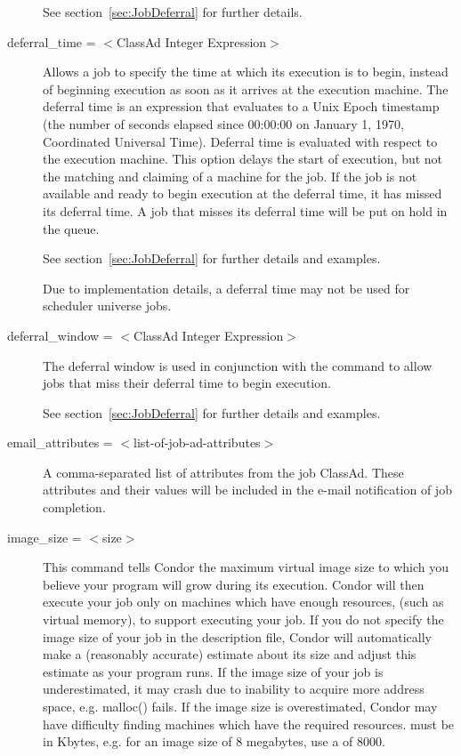 \begin{description}
See section~\ref{sec:JobDeferral} for further details.


\item[deferral\_time = $<$ClassAd Integer Expression$>$]
Allows a job to specify the time at which its execution
is to begin,
instead of beginning execution as soon as it arrives at the execution
machine. The deferral time is an expression that 
evaluates to a Unix Epoch timestamp (the number of
seconds elapsed since 00:00:00 on January 1, 1970, Coordinated
Universal Time). 
Deferral time is evaluated with respect to the execution machine.
This option delays the start of
execution, but not the matching and claiming of
a machine for the job.
If the job is not available and ready to begin
execution at the deferral time, it has missed its deferral time.
A job that misses its deferral time will be put on hold
in the queue. 

See section~\ref{sec:JobDeferral} for further details and examples.

Due to implementation details,
a deferral time may not be used for scheduler universe jobs.


\item[deferral\_window = $<$ClassAd Integer Expression$>$]
The deferral window is used in conjunction with the
 command to allow jobs that
miss their deferral time to begin execution.

See section~\ref{sec:JobDeferral} for further details and examples.


\item[email\_attributes = $<$list-of-job-ad-attributes$>$] 
A comma-separated list of attributes from the job ClassAd. These
attributes and their values will be included in the e-mail notification
of job completion.


\item[image\_size = $<$size$>$] This command tells Condor the maximum
virtual image size to which you believe your program will grow during
its execution. Condor will then execute your job only on machines which
have enough resources, (such as virtual memory), to support executing
your job. If you do not specify the image size of your job in the
description file, Condor will automatically make a (reasonably accurate)
estimate about its size and adjust this estimate as your program runs.
If the image size of your job is underestimated, it may crash due to
inability to acquire more address space, e.g. malloc() fails. If the image
size is overestimated, Condor may have difficulty finding machines which
have the required resources.  must be in Kbytes, e.g. for
an image size of 8 megabytes, use a  of 8000.


\end{description}
